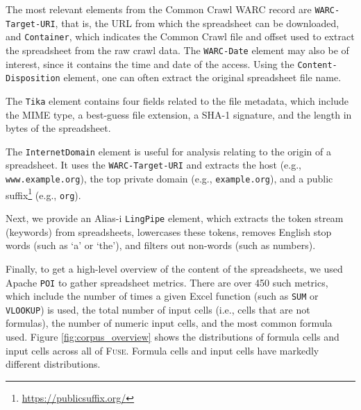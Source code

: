 \documentclass{svjour3}
\begin{document}
The most relevant elements from the Common Crawl WARC record are \texttt{WARC-Target-URI}, that is, the URL from which the spreadsheet can be downloaded, and \texttt{Container}, which indicates the Common Crawl file and offset used to extract the spreadsheet from the raw crawl data. The \texttt{WARC-Date} element may also be of interest, since it contains the time and date of the access. Using the \texttt{Content-Disposition} element, one can often extract the original spreadsheet file name.

The \texttt{Tika} element contains four fields related to the file metadata, which include the MIME type, a best-guess file extension, a SHA-1 signature, and the length in bytes of the spreadsheet.


The \texttt{InternetDomain} element is useful for analysis relating to the origin of a spreadsheet. It uses the \texttt{WARC-Target-URI} and extracts the host (e.g., \texttt{www.example.org}), the top private domain (e.g., \texttt{example.org}), and a public suffix\footnote{\url{https://publicsuffix.org/}} (e.g., \texttt{org}).


Next, we provide an Alias-i \texttt{LingPipe} element, which extracts the token stream (keywords) from spreadsheets, lowercases these tokens, removes English stop words (such as `a' or `the'), and filters out non-words (such as numbers).


Finally, to get a high-level overview of the content of the spreadsheets, we used Apache \texttt{POI} to gather spreadsheet metrics. There are over 450 such metrics, which include the number of times a given Excel function (such as \texttt{SUM} or \texttt{VLOOKUP}) is used, the total number of input cells (i.e., cells that are not formulas), the number of numeric input cells, and the most common formula used. 
%
Figure \ref{fig:corpus_overview} shows the distributions of formula cells
and input cells across all of \textsc{Fuse}. Formula cells and input cells have markedly different distributions.
\end{document}
